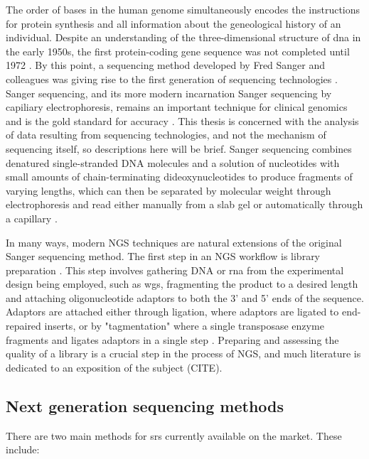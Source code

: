 The order of bases in the human genome simultaneously encodes the instructions for protein synthesis and all information about the geneological history of an individual. Despite an understanding of the three-dimensional structure of \gls{dna} in the early 1950s, the first protein-coding gene sequence was not completed until 1972 \cite{JD1953,JOU1972}. By this point, a sequencing method developed by Fred Sanger and colleagues was giving rise to the first generation of sequencing technologies \cite{Kulkarni2014}. Sanger sequencing, and its more modern incarnation Sanger sequencing by capiliary electrophoresis, remains an important technique for clinical genomics and is the gold standard for accuracy \cite{Shendure2017}. This thesis is concerned with the analysis of data resulting from sequencing technologies, and not the mechanism of sequencing itself, so descriptions here will be brief. Sanger sequencing combines denatured single-stranded DNA molecules and a solution of nucleotides with small amounts of chain-terminating dideoxynucleotides to produce fragments of varying lengths, which can then be separated by molecular weight through electrophoresis and read either manually from a slab gel or automatically through a capillary \cite{F1977,Liu2012}. 

In many ways, modern NGS techniques are natural extensions of the original Sanger sequencing method. The first step in an NGS workflow is library preparation \cite{Head2018}. This step involves gathering DNA or \gls{rna} from the experimental design being employed, such as \gls{wgs}, fragmenting the product to a desired length and attaching oligonucleotide adaptors to both the 3' and 5' ends of the sequence. Adaptors are attached either through ligation, where adaptors are ligated to end-repaired inserts, or by "tagmentation" where a single transposase enzyme fragments and ligates adaptors in a single step \cite{R2011}. Preparing and assessing the quality of a library is a crucial step in the process of NGS, and much literature is dedicated to an exposition of the subject (CITE). 

\subsection{Next generation sequencing methods} \label{intro:ngs_methods}

There are two main methods for \gls{srs} currently available on the market. These include: 

